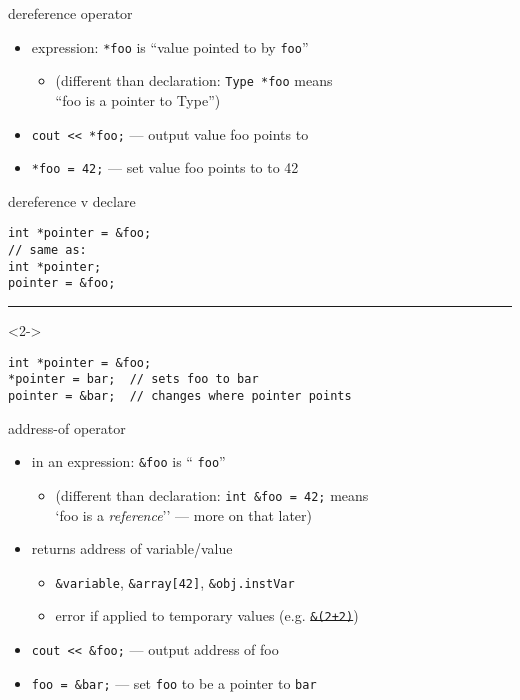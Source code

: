 \begin{frame}[fragile,label=dereference]{dereference operator}
    \begin{itemize}
        \item expression: \verb|*foo| is ``value pointed to by \verb|foo|''
        \begin{itemize}
            \item (different than declaration: \verb|Type *foo| means\\``foo is a pointer to Type'')
        \end{itemize}
        \vspace{.5cm}
        \item \lstinline|cout << *foo;| --- output value foo points to
        \item \lstinline|*foo = 42;| --- set value foo points to to 42
    \end{itemize}
\end{frame}

\begin{frame}[fragile,label=derefAndDecl]{dereference v declare}
\lstset{language=C++,style=small}
\begin{lstlisting}
int *pointer = &foo;
// same as:
int *pointer;
pointer = &foo;
\end{lstlisting}
\hrule
\begin{visibleenv}<2->
\begin{lstlisting}
int *pointer = &foo;
*pointer = bar;  // sets foo to bar
pointer = &bar;  // changes where pointer points
\end{lstlisting}
\end{visibleenv}
\end{frame}

\begin{frame}[fragile,label=addressOf]{address-of operator}
    \begin{itemize}
        \item in an expression: \verb|&foo| is `` \verb|foo|''
        \begin{itemize}
            \item (different than declaration: \verb|int &foo = 42;| means \\
                `foo is a \textit{reference}'' --- more on that later)
        \end{itemize}
        \vspace{.5cm}
        \item returns address of variable/value
            \begin{itemize}
            \item {\tt \&variable}, {\tt \&array[42]}, {\tt \&obj.instVar}
            \item error if applied to temporary values (e.g. \sout{\tt \&(2+2)})
            \end{itemize}
        \vspace{.5cm}
        \item \lstinline|cout << &foo;| --- output address of foo
        \item \lstinline|foo = &bar;| --- set {\tt foo} to be a pointer to {\tt bar}
    \end{itemize}
\end{frame}

